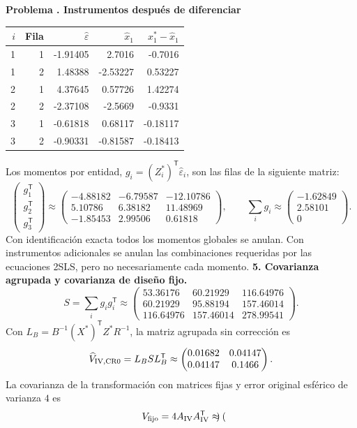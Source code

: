 \documentclass[11pt,a4paper]{article}
\newcommand{\T}{^{\mathsf T}}
\theoremstyle{definition}
\newcounter{problema}
\newenvironment{resuelto}[1]{\refstepcounter{problema}\par\medskip\Needspace{6\baselineskip}\textbf{Problema \theproblema. #1}\par}{\par\medskip}
\newcommand{\eps}{\varepsilon}
\begin{document}
\begin{resuelto}{Instrumentos después de diferenciar}
\begin{center}\small
\begin{tabular}{rrrrr}
\toprule
$i$&Fila&$\widehat\eps$&$\widehat x_1$&$x_1^*-\widehat x_1$\\
\midrule
1&1&-1.91405&2.7016&-0.7016\\
1&2&1.48388&-2.53227&0.53227\\
2&1&4.37645&0.57726&1.42274\\
2&2&-2.37108&-2.5669&-0.9331\\
3&1&-0.61818&0.68117&-0.18117\\
3&2&-0.90331&-0.81587&-0.18413\\
\bottomrule
\end{tabular}
\end{center}
Los momentos por entidad, $g_i=(Z_i^*)\T\widehat\eps_i$, son las filas de la siguiente matriz:
\[
\begin{pmatrix}g_1\T\\g_2\T\\g_3\T\end{pmatrix}\approx\begin{pmatrix}
-4.88182&-6.79587&-12.10786\\5.10786&6.38182&11.48969\\-1.85453&2.99506&0.61818
\end{pmatrix},\qquad \sum_i g_i\approx\begin{pmatrix}
-1.62849\\2.58101\\0
\end{pmatrix}.
\]
Con identificación exacta todos los momentos globales se anulan. Con instrumentos adicionales se anulan las combinaciones requeridas por las ecuaciones 2SLS, pero no necesariamente cada momento.
\textbf{5. Covarianza agrupada y covarianza de diseño fijo.}
\[
S=\sum_i g_ig_i\T\approx\begin{pmatrix}
53.36176&60.21929&116.64976\\60.21929&95.88194&157.46014\\116.64976&157.46014&278.99541
\end{pmatrix}.
\]
Con $L_B=B^{-1}(X^*)\T Z^*R^{-1}$, la matriz agrupada sin corrección es
\[
\widehat V_{\rm IV,CR0}=L_BSL_B\T\approx\begin{pmatrix}
0.01682&0.04147\\0.04147&0.1466
\end{pmatrix}.
\]
La covarianza de la transformación con matrices fijas y error original esférico de varianza $4$ es
\[
V_{\rm fijo}=4A_{\rm IV}A_{\rm IV}\T\approx\begin{pmatrix}

\end{pmatrix}\]
\end{resuelto}
\end{document}
